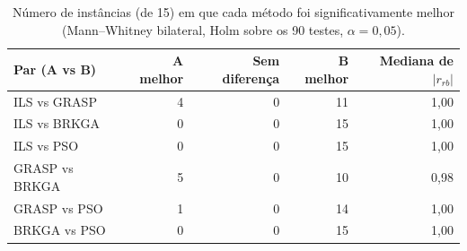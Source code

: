 \begin{table}[t]
\centering
\caption{Número de instâncias (de 15) em que cada método foi significativamente melhor (Mann--Whitney bilateral, Holm sobre os 90 testes, $\alpha=0{,}05$).}
\label{tab:singleproblem}
\footnotesize
\begin{tabular}{@{}lrrrr@{}}
\toprule
Par (A vs B) & A melhor & Sem diferença & B melhor & Mediana de $|r_{rb}|$ \\
\midrule
ILS vs GRASP & 4 & 0 & 11 & 1,00 \\
ILS vs BRKGA & 0 & 0 & 15 & 1,00 \\
ILS vs PSO & 0 & 0 & 15 & 1,00 \\
GRASP vs BRKGA & 5 & 0 & 10 & 0,98 \\
GRASP vs PSO & 1 & 0 & 14 & 1,00 \\
BRKGA vs PSO & 0 & 0 & 15 & 1,00 \\
\bottomrule
\end{tabular}
\end{table}
